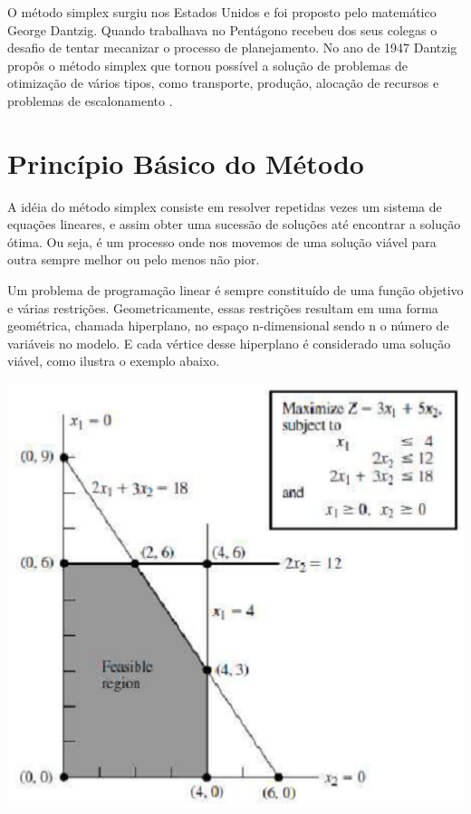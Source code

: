 O método simplex surgiu nos Estados Unidos e foi proposto pelo matemático George Dantzig. Quando trabalhava no Pentágono recebeu dos seus colegas o desafio de tentar mecanizar o processo de planejamento. No ano de 1947 Dantzig propôs o método simplex que tornou possível a solução de problemas de otimização de vários tipos, como transporte, produção, alocação de recursos e problemas de escalonamento \cite{OrigemSimplex}.

\section{Princípio Básico do Método}
A idéia do método simplex consiste em resolver repetidas vezes um sistema de equações lineares, e assim obter uma sucessão de soluções até encontrar a solução ótima. Ou seja, é um processo onde nos movemos de uma solução viável para outra sempre melhor ou pelo menos não pior.

Um problema de programação linear é sempre constituído de uma função objetivo e várias restrições. Geometricamente, essas restrições resultam em uma forma geométrica, chamada hiperplano, no espaço n-dimensional sendo n o número de variáveis no modelo. E cada vértice desse hiperplano é considerado uma solução viável, como ilustra o exemplo abaixo.
\begin{center}
	\includegraphics[scale=0.5]{graficos/Simplex_grafico_completo}
	\label{img:simplex_grafico_completo}
	\cite{Hillier}
\end{center}

